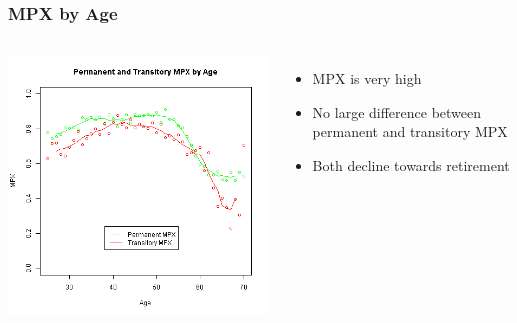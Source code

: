 \documentclass{beamer}
\begin{document}
\frame
{
	\frametitle{MPX by Age}
	\begin{columns}
		\centering
		\includegraphics[scale=0.35]{../Figures/MPXByAge.png}
		\begin{itemize}
			\item MPX is very high
			\item No large difference between permanent and transitory MPX
			\item Both decline towards retirement
		\end{itemize}
	\end{columns} 	
}
\frame
\end{document}
